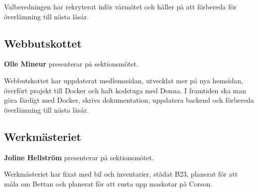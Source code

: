 \documentclass[../protokoll-vintermote-2024.tex]{subfiles}
\begin{document}
Valberedningen har rekryterat inför vårmötet och håller på att förbereda för överlämning till nästa läsår.

\pagebreak

\subsection{Webbutskottet}
\textbf{Olle Mineur} presenterar på sektionsmötet.

Webbutskottet har uppdaterat medlemssidan, utvecklat mer på nya hemsidan, överfört projekt till Docker och haft kodstuga med Donna. I framtiden ska man göra färdigt med Docker, skriva dokumentation, uppdatera backend och förbereda överlämning till nästa läsår.

\subsection{Werkmästeriet}
\textbf{Joline Hellström} presenterar på sektionsmötet.

Werkmästeriet har fixat med bil och inventarier, städat B23, planerat för att måla om Bettan och planerat för att rusta upp maskotar på Corson.
\end{document}

